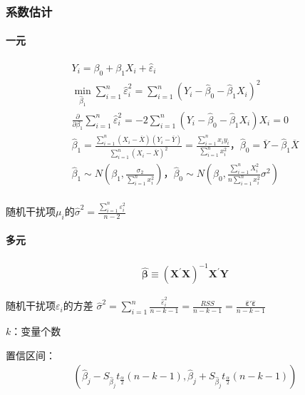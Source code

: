 \documentclass[12pt]{book}
\begin{document}
\subsubsection{系数估计}

\paragraph{一元}


\begin{gather*}
    Y_i = \beta_0+\beta_{1}X_{i}+{\hat{\varepsilon}}_i\\
    \min_{{\hat{\beta}}_1}{\sum_{i=1}^{n}{\hat{\varepsilon}}_i^2} =\sum_{i=1}^{n}{\left(Y_i-{\hat{\beta}}_0-{\hat{\beta}}_1 X_i\right)^2}\\
    \frac{\partial}{\partial \beta_{1}}  \sum_{i=1}^{n}{\hat{ε}_i^2} =-2\sum_{i=1}^{n}{(Y_i-\hat{\beta}_{0}-\hat{\beta}_{1} X_i) X_{i}}=0\\
    \hat{\beta}_{1} = \frac{\sum_{i=1}^{n}\left(X_i-\overline{X}\right)\left(Y_i-\overline{Y}\right)}{\sum_{i=1}^{n}\left(X_i-\overline{X}\right)^2}=\frac{\sum_{i=1}^{n}{x_i y_i}}{\sum_{i=1}^{n}x_i^2}，\hat{\beta}_{0}=\overline{Y}-\hat{\beta}_{1}\overline{X}\\
    {\hat{\beta}}_1 \sim N\left(\beta_1,\frac{\sigma_2}{\sum_{i=1}^{n}{x_i^2}}\right)，\hat{\beta}_{0} \sim N\left(\beta_0, \frac{\sum_{i=1}^{n}{X_i^2}}{ n \sum_{i=1}^{n}{x_i^2}} \sigma^2\right)\\
\end{gather*}


随机干扰项$\mu_{i}$的$\hat{\sigma}^2 =\frac{\sum_{i=1}^{n}{\varepsilon_i^2}}{n-2}$

\paragraph{多元}

\begin{gather*}
    \hat{\bm{\beta}} \equiv \left(\bm{X}^\prime\bm{X}\right)^{-1}\bm{X}^\prime\bm{Y}
\end{gather*}

随机干扰项$\varepsilon_i$的方差
$\hat{\sigma}^2  = \sum_{i=1}^{n}{ 	\frac{ \hat{\varepsilon}_i^2 }{n-k-1} 	} = \frac{RSS}{n-k-1} = \frac{\bm{\hat{\varepsilon}'\hat{\varepsilon}}}{n-k-1}$

$k$：变量个数

置信区间：
\begin{gather*}
    \left( \hat{\beta}_j-S_{\hat{\beta}_j} t_{\frac{\alpha}{2}}(n-k-1), \hat{\beta}_j+S_{\hat{\beta}_j} t_{\frac{\alpha}{2}}(n-k-1) \right)
\end{gather*}
\end{document}
